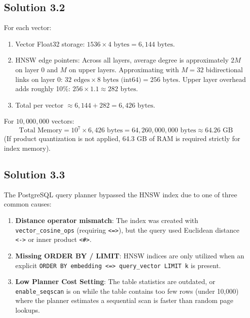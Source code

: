 \subsection*{Solution 3.2}
For each vector:
\begin{enumerate}
  \item Vector Float32 storage: $1536 \times 4 \text{ bytes} = 6,144 \text{ bytes}$.
  \item HNSW edge pointers: Across all layers, average degree is approximately $2M$ on layer 0 and $M$ on upper layers. Approximating with $M = 32$ bidirectional links on layer 0:
  $32 \text{ edges} \times 8 \text{ bytes (int64)} = 256 \text{ bytes}$.
  Upper layer overhead adds roughly 10\%: $256 \times 1.1 \approx 282 \text{ bytes}$.
  \item Total per vector $\approx 6,144 + 282 = 6,426 \text{ bytes}$.
\end{enumerate}
For $10,000,000$ vectors:
\[
\text{Total Memory} = 10^7 \times 6,426 \text{ bytes} = 64,260,000,000 \text{ bytes} \approx 64.26 \text{ GB}
\]
(If product quantization is not applied, 64.3 GB of RAM is required strictly for index memory).

\subsection*{Solution 3.3}
The PostgreSQL query planner bypassed the HNSW index due to one of three common causes:
\begin{enumerate}
  \item \textbf{Distance operator mismatch}: The index was created with \texttt{vector\_cosine\_ops} (requiring \texttt{\textless{}=\textgreater{}}), but the query used Euclidean distance \texttt{\textless{}-\textgreater{}} or inner product \texttt{\textless{}\#\textgreater{}}.
  \item \textbf{Missing ORDER BY / LIMIT}: HNSW indices are only utilized when an explicit \texttt{ORDER BY embedding \textless{}=\textgreater{} query\_vector LIMIT k} is present.
  \item \textbf{Low Planner Cost Setting}: The table statistics are outdated, or \texttt{enable\_seqscan} is on while the table contains too few rows (under 10,000) where the planner estimates a sequential scan is faster than random page lookups.
\end{enumerate}

